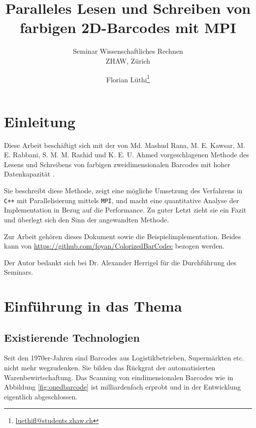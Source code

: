 \documentclass[11pt]{scrreprt} %
\title{Paralleles Lesen und Schreiben von farbigen 2D-Barcodes mit MPI}
\subtitle{Seminar Wissenschaftliches Rechnen \\ ZHAW, Zürich}
\author{Florian Lüthi\footnote{\url{luethifl@students.zhaw.ch}}}
\theoremstyle{definition}
\begin{document}
\maketitle

\tableofcontents

\chapter{Einleitung}

Diese Arbeit beschäftigt sich mit der von Md. Mashud Rana, M. E. Kawsar, M. E. Rabbani, S. M. M. Rashid und K. E. U. Ahmed vorgeschlagenen Methode des Lesens und Schreibens von farbigen zweidimensionalen Barcodes mit hoher Datenkapazität \cite{paper}.

Sie beschreibt diese Methode, zeigt eine mögliche Umsetzung des Verfahrens in {\tt C++} mit Parallelisierung mittels {\tt MPI}, und macht eine quantitative Analyse der Implementation in Bezug auf die Performance. Zu guter Letzt zieht sie ein Fazit und überlegt sich den Sinn der angewandten Methode.

Zur Arbeit gehören dieses Dokument sowie die Beispielimplementation. Beides kann von \url{https://github.com/foyan/ColorizedBarCodec} bezogen werden.

Der Autor bedankt sich bei Dr. Alexander Herrigel für die Durchführung des Seminars.

\chapter{Einführung in das Thema}

\section{Existierende Technologien}

Seit den 1970er-Jahren \cite{wiki:barcode} sind Barcodes aus Logistikbetrieben, Supermärkten etc. nicht mehr wegzudenken. Sie bilden das Rückgrat der automatisierten Warenbewirtschaftung. Das Scanning von eindimensionalen Barcodes wie in Abbildung \ref{fig:onedbarcode} ist milliardenfach erprobt und in der Entwicklung eigentlich abgeschlossen.
\end{document}
